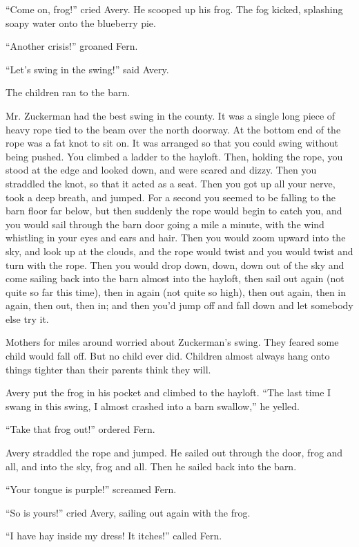 \documentclass[a4paper, oneside]{book}
\begin{document}
``Come on, frog!'' cried Avery. He scooped up his frog. The fog
kicked, splashing soapy water onto the blueberry pie.

``Another crisis!'' groaned Fern. 

``Let's swing in the swing!'' said Avery. 

The children ran to the barn.

 Mr. Zuckerman had the best swing in the county. It was a
single long piece of heavy rope tied to the beam over the north
doorway. At the bottom end of the rope was a fat knot to sit on. It
was arranged so that you could swing without being pushed. You
climbed a ladder to the hayloft. Then, holding the rope, you stood
at the edge and looked down, and were scared and dizzy. Then you
straddled the knot, so that it acted as a seat. Then you got up all
your nerve, took a deep breath, and jumped. For a second you
seemed to be falling to the barn floor far below, but then suddenly
the rope would begin to catch you, and you would sail through the
barn door going a mile a minute, with the wind whistling in your
eyes and ears and hair. Then you would zoom upward into the sky, 
and look up at the clouds, and the rope would twist and you would
twist and turn with the rope. Then you would drop down, down,
down out of the sky and come sailing back into the barn almost
into the hayloft, then sail out again (not quite so far this time), then
in again (not quite so high), then out again, then in again, then out,
then in; and then you'd jump off and fall down and let somebody
else try it. 

Mothers for miles around worried about Zuckerman's swing.
They feared some child would fall off. But no child ever did.
Children almost always hang onto things tighter than their parents
think they will.

 Avery put the frog in his pocket and climbed to the hayloft.
``The last time I swang in this swing, I almost crashed into a barn
swallow,'' he yelled. 

``Take that frog out!'' ordered Fern.

Avery straddled the rope and jumped. He sailed out through
the door, frog and all, and into the sky, frog and all. Then he sailed
back into the barn.

``Your tongue is purple!'' screamed Fern.

``So is yours!'' cried Avery, sailing out again with the frog.

``I have hay inside my dress! It itches!'' called Fern.
\end{document}
